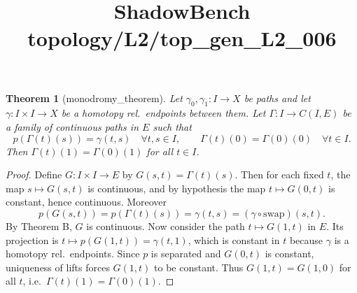 \documentclass{article}
\title{ShadowBench topology/L2/top\_gen\_L2\_006}
\newtheorem{theorem}{Theorem}
\begin{document}
\maketitle


\begin{theorem}[monodromy_theorem]
Let $\gamma_0,\gamma_1:I\to X$ be paths and let $\gamma:I\times I\to X$ be a homotopy rel.\ endpoints
between them. Let $\Gamma:I\to C(I,E)$ be a family of continuous paths in $E$ such that
\[
p(\Gamma(t)(s))=\gamma(t,s)\quad \forall t,s\in I,
\qquad
\Gamma(t)(0)=\Gamma(0)(0)\quad \forall t\in I.
\]
Then $\Gamma(t)(1)=\Gamma(0)(1)$ for all $t\in I$.
\end{theorem}

\begin{proof}
Define $G:I\times I\to E$ by $G(s,t)=\Gamma(t)(s)$. Then for each fixed $t$, the map $s\mapsto G(s,t)$
is continuous, and by hypothesis the map $t\mapsto G(0,t)$ is constant, hence continuous. Moreover
\[
p(G(s,t))=p(\Gamma(t)(s))=\gamma(t,s)= (\gamma\circ\mathrm{swap})(s,t).
\]
By Theorem B, $G$ is continuous.
Now consider the path $t\mapsto G(1,t)$ in $E$. Its projection is
$t\mapsto p(G(1,t))=\gamma(t,1)$, which is constant in $t$ because $\gamma$ is a homotopy rel.\ endpoints.
Since $p$ is separated and $G(0,t)$ is constant, uniqueness of lifts forces $G(1,t)$ to be constant.
Thus $G(1,t)=G(1,0)$ for all $t$, i.e.\ $\Gamma(t)(1)=\Gamma(0)(1)$.
\end{proof}
\end{document}

